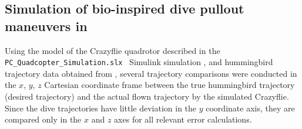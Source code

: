 \subsection{Simulation of bio-inspired dive pullout maneuvers in \Matlab}

Using the model of the Crazyflie quadrotor described in the \lstinline{PC_Quadcopter_Simulation.slx} \MATLAB\ Simulink simulation \cite{hartman2014quadcopter}, 
and hummingbird trajectory data obtained from \cite{clark2009courtship}, several trajectory comparisons were conducted in the $x$, $y$, $z$ Cartesian coordinate frame between the true hummingbird trajectory (desired trajectory) and the actual flown trajectory by the simulated Crazyflie. Since the dive trajectories have little deviation in the $y$ coordinate axis, they are compared only in the $x$ and $z$ axes for all relevant error calculations. 

